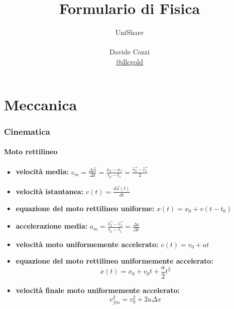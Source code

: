 \documentclass[a4paper,12pt, oneside]{book}
\title{Formulario di Fisica}
\author{UniShare\\\\Davide Cozzi\\\href{https://t.me/dlcgold}{@dlcgold}}
\date{}
\begin{document}
\maketitle


\newtheorem{teorema}{Teorema}
\newtheorem{definizione}{Definizione}
\newtheorem{esempio}{Esempio}
\newtheorem{corollario}{Corollario}
\newtheorem{lemma}{Lemma}
\newtheorem{osservazione}{Osservazione}
\newtheorem{nota}{Nota}
\newtheorem{esercizio}{Esercizio}
\tableofcontents

\renewcommand{\chaptermark}[1]{%
\markboth{\chaptername
\ \thechapter.\ #1}{}}
\renewcommand{\sectionmark}[1]{\markright{\thesection.\ #1}}
\chapter{Meccanica}
\subsection{Cinematica}
\subsubsection{Moto rettilineo}
\begin{itemize}
\item \textbf{velocità media: }$v_m=\frac{\Delta \vec{x}}{\Delta t}=\frac{x_2-x_1}{t_2-t_1}=\frac{\vec{v_2}-\vec{v_1}}{2}$
\item  \textbf{velocità istantanea: }$v(t)=\frac{d\vec{x}(t)}{dt}$
\item \textbf{equazione del moto rettilineo uniforme: }$x(t)=x_0+v(t-t_0)$
\item \textbf{accelerazione media:} $a_m=\frac{\vec{v_2}-\vec{v_1}}{t_2-t_1}=\frac{\Delta v}{\Delta t}$
\item \textbf{velocità moto uniformemente accelerato:} $v(t)=v_0+at$
\item \textbf{equazione del moto rettilineo uniformemente accelerato:} $$x(t)=x_0+v_0t+\frac{a}{2}t^2$$
\item \textbf{velocità finale moto uniformemente accelerato:}
$$v_{fin}^2=v_0^2+2a\Delta x$$
\end{itemize}
\newpage
\end{document}
